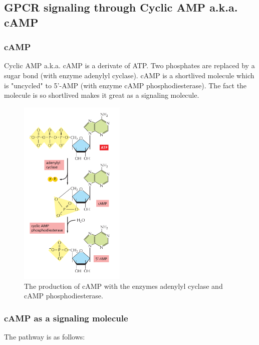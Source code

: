 \documentclass[../main.tex]{subfiles}
\begin{document}
\subsection{GPCR signaling through Cyclic AMP a.k.a. cAMP}
\subsubsection{cAMP}

Cyclic AMP a.k.a. cAMP is a derivate of ATP. Two phosphates are replaced by a sugar bond (with enzyme adenylyl cyclase). cAMP is a shortlived molecule which is "uncycled" to 5'-AMP (with enzyme cAMP phosphodiesterase). The fact the molecule is so shortlived makes it great as a signaling molecule.
\begin{figure}[H]
	\centering
	\includegraphics[width=0.45\textwidth]{cAMP_prod}
	\caption{The production of cAMP with the enzymes adenylyl cyclase and cAMP phosphodiesterase.}
\end{figure}

\subsubsection{cAMP as a signaling molecule}

The pathway is as follows:
\end{document}
